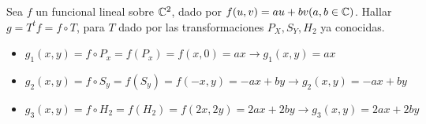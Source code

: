 \item Sea $f$ un funcional lineal sobre $\mathbb{C}^2$, dado por $f(u,v)=au+bv(a,b\in\mathbb{C})$. Hallar $g=T^tf=f\circ T$, para $T$ dado por las transformaciones $P_X,S_Y,H_2$ ya conocidas.
    \begin{mdframed}[style=s]
        \begin{itemize}
            \item $g_1(x,y)=f\circ P_x=f(P_x)=f(x,0)=ax\to g_1(x,y)=ax$
            \item $g_2(x,y)=f\circ S_y=f(S_y)=f(-x,y)=-ax+by\to g_2(x,y)=-ax+by$
            \item $g_3(x,y)=f\circ H_2=f(H_2)=f(2x,2y)=2ax+2by\to g_3(x,y)=2ax+2by$
        \end{itemize}
    \end{mdframed}